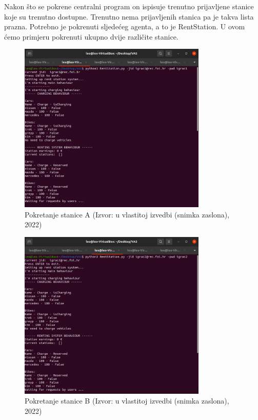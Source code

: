 \documentclass{foi}
\begin{document}
Nakon što se pokrene centralni program on ispisuje trenutno prijavljene stanice koje su trenutno dostupne. Trenutno nema prijavljenih stanica pa je takva lista prazna. Potrebno je pokrenuti sljedećeg agenta, a to je RentStation. U ovom ćemo primjeru pokrenuti ukupno dvije različite stanice.

\begin{figure}[H]
	\centering
	\includegraphics[width=0.8\textwidth]{slike/vas2}
	\caption{Pokretanje stanice A (Izvor: u vlastitoj izvedbi (snimka zaslona), 2022)}
\end{figure}

\begin{figure}[H]
	\centering
	\includegraphics[width=0.8\textwidth]{slike/vas3}
	\caption{Pokretanje stanice B (Izvor: u vlastitoj izvedbi (snimka zaslona), 2022)}
\end{figure}
\end{document}
